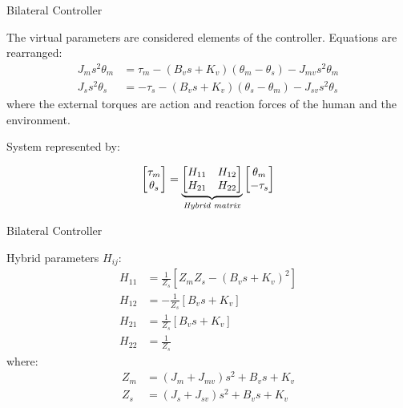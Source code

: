 \documentclass[10pt]{beamer}
\begin{document}
\begin{frame}[fragile]{Bilateral Controller}

The virtual parameters are considered elements of the controller. Equations are rearranged:
\begin{align*}
	J_m s^2 \theta_m &= \tau_m - (B_v s + K_v) (\theta_m - \theta_s) - J_{mv} s^2 \theta_m \\
	J_s s^2 \theta_s &= - \tau_s - (B_v s + K_v) (\theta_s - \theta_m) - J_{sv} s^2 \theta_s
\end{align*}
where the external torques are action and reaction forces of the human and the environment.

System represented by:

\begin{equation*}
\begin{bmatrix}
\tau_m \\ \theta_s
\end{bmatrix} = 
\underbrace{\begin{bmatrix}
H_{11} & H_{12} \\
H_{21} & H_{22}
\end{bmatrix}}_{\text{\textit{Hybrid matrix}}}
\begin{bmatrix}
\theta_m \\ - \tau_s
\end{bmatrix}
\label{hybrid_matrix}
\end{equation*}

\end{frame}

\begin{frame}[fragile]{Bilateral Controller}

Hybrid parameters $ H_{ij} $:
\begin{align*}
	H_{11} &= \frac{1}{Z_s}[Z_m Z_s - (B_v s + K_v)^2] \\
	H_{12} &= -\frac{1}{Z_s}[B_v s + K_v] \\
	H_{21} &= \frac{1}{Z_s}[B_v s + K_v] \\
	H_{22} &= \frac{1}{Z_s} 
\end{align*}
where:
\begin{align*}
	Z_m &= (J_m + J_{mv}) s^2 + B_v s + K_v \\
	Z_s &= (J_s + J_{sv}) s^2 + B_v s + K_v
\end{align*}

\end{frame}
\end{document}
